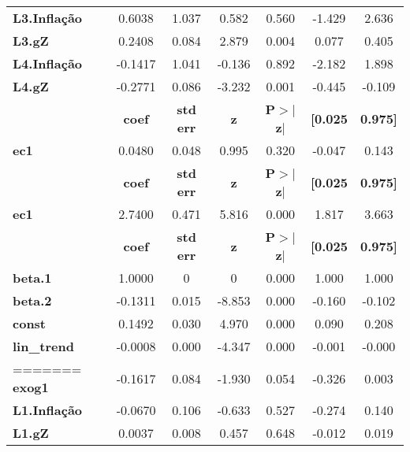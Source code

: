 \begin{center}
\begin{tabular}{lcccccc}
\textbf{L3.Inflação} &       0.6038  &        1.037     &     0.582  &         0.560        &       -1.429    &        2.636     \\
\textbf{L3.gZ}       &       0.2408  &        0.084     &     2.879  &         0.004        &        0.077    &        0.405     \\
\textbf{L4.Inflação} &      -0.1417  &        1.041     &    -0.136  &         0.892        &       -2.182    &        1.898     \\
\textbf{L4.gZ}       &      -0.2771  &        0.086     &    -3.232  &         0.001        &       -0.445    &       -0.109     \\
             & \textbf{coef} & \textbf{std err} & \textbf{z} & \textbf{P$> |$z$|$} & \textbf{[0.025} & \textbf{0.975]}  \\
\midrule
\textbf{ec1} &       0.0480  &        0.048     &     0.995  &         0.320        &       -0.047    &        0.143     \\
             & \textbf{coef} & \textbf{std err} & \textbf{z} & \textbf{P$> |$z$|$} & \textbf{[0.025} & \textbf{0.975]}  \\
\midrule
\textbf{ec1} &       2.7400  &        0.471     &     5.816  &         0.000        &        1.817    &        3.663     \\
                    & \textbf{coef} & \textbf{std err} & \textbf{z} & \textbf{P$> |$z$|$} & \textbf{[0.025} & \textbf{0.975]}  \\
\midrule
\textbf{beta.1}     &       1.0000  &            0     &         0  &         0.000        &        1.000    &        1.000     \\
\textbf{beta.2}     &      -0.1311  &        0.015     &    -8.853  &         0.000        &       -0.160    &       -0.102     \\
\textbf{const}      &       0.1492  &        0.030     &     4.970  &         0.000        &        0.090    &        0.208     \\
\textbf{lin\_trend} &      -0.0008  &        0.000     &    -4.347  &         0.000        &       -0.001    &       -0.000     \\
=======
\textbf{exog1}       &      -0.1617  &        0.084     &    -1.930  &         0.054        &       -0.326    &        0.003     \\
\textbf{L1.Inflação} &      -0.0670  &        0.106     &    -0.633  &         0.527        &       -0.274    &        0.140     \\
\textbf{L1.gZ}       &       0.0037  &        0.008     &     0.457  &         0.648        &       -0.012    &        0.019     \\

\end{tabular}
\end{center}
